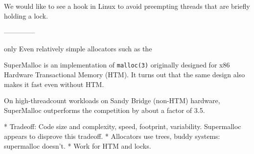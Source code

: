 \documentclass[pldi]{sigplanconf-pldi15}
\begin{document}
We would like to see a hook in Linux to avoid preempting threads that
are briefly holding a lock.

--------------




only Even relatively simple allocators such as the

SuperMalloc is an implementation of \texttt{malloc(3)} originally designed for
x86 Hardware Transactional Memory (HTM).  
It turns out that the same
design also makes it fast even without HTM.  

On high-threadcount
workloads on Sandy Bridge (non-HTM) hardware, SuperMalloc outperforms
the competition by about a factor of 3.5.




* Tradeoff: Code size and complexity, speed, footprint, variability.  Supermalloc appears to disprove this tradeoff.
* Allocators use trees, buddy systems: supermalloc doesn't.
* Work for HTM and locks.
\end{document}

